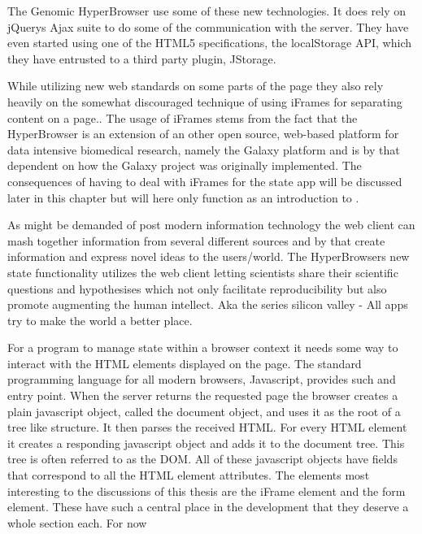 \documentclass[english]{ifimaster}
\begin{document}
The Genomic HyperBrowser use some of these new technologies. It does rely on jQuerys Ajax suite to do some of the communication with the server. They have even started using one of the HTML5 specifications, the localStorage API, which they have entrusted to a third party plugin, JStorage. 

While utilizing new web standards on some parts of the page they also rely heavily on the somewhat discouraged technique of using iFrames for separating content on a page..%
The usage of iFrames stems from the fact that the HyperBrowser is an extension of an other open source, web-based platform for data intensive biomedical research, namely the Galaxy platform and is by that dependent on how the Galaxy project was originally implemented. The consequences of having to deal with iFrames for the state app will be discussed later in this chapter but will here only function as an introduction to .

As might be demanded of post modern information technology the web client can mash together information from several different sources and by that create information and express novel ideas to the users/world. The HyperBrowsers new state functionality utilizes the web client letting scientists share their scientific questions and hypothesises which not only facilitate reproducibility but also promote augmenting the human intellect. Aka the series silicon valley - All apps try to make the world a better place.

For a program to manage state within a browser context it needs some way to interact with the HTML elements displayed on the page. The standard programming language for all modern browsers, Javascript, provides such and entry point. When the server returns the requested page the browser creates a plain javascript object, called the document object, and uses it as the root of a tree like structure. It then parses the received HTML. For every HTML element it creates a responding javascript object and adds it to the document tree. This tree is often referred to as the DOM. All of these javascript objects have fields that correspond to all the HTML element attributes. The elements most interesting to the discussions of this thesis are the iFrame element and the form element. These have such a central place in the development that they deserve a whole section each. For now  
\end{document}
